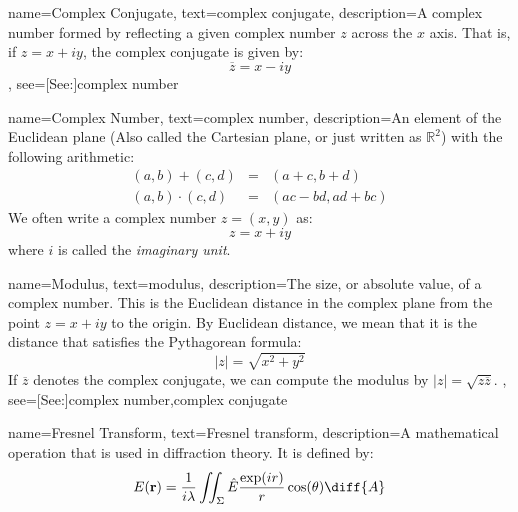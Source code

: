 {
    name={Complex Conjugate},
    text={complex conjugate},
    description={A complex number formed by reflecting a
                 given complex number $z$ across the $x$
                 axis. That is, if $z=x+iy$, the complex
                 conjugate is given by:
                 \begin{equation*}
                     \overline{z}=x-iy
                 \end{equation*}
                },
    see=[See:]{complex number}
}

{
    name={Complex Number},
    text={complex number},
    description={An element of the Euclidean plane (Also called the
                 Cartesian plane, or just written as $\mathbb{R}^{2}$)
                 with the following arithmetic:
                 \begin{eqnarray*}
                     (a,b)+(c,d)
                     \!&\!=\!&\!(a+c,b+d)\\
                     (a,b)\cdot(c,d)
                     \!&\!=\!&\!(ac-bd,ad+bc)
                 \end{eqnarray*}
                 We often write a complex number $z=(x,y)$ as:
                 \begin{equation*}
                     z=x+iy
                 \end{equation*}
                 where $i$ is called the \textit{imaginary unit}.
                }
}

{
    name={Modulus},
    text={modulus},
    description={The size, or absolute value, of a complex number. This
                 is the Euclidean distance in the complex plane from the
                 point $z=x+iy$ to the origin. By Euclidean distance,
                 we mean that it is the distance that satisfies the
                 Pythagorean formula:
                 \begin{equation*}
                     |z|=\sqrt{x^{2}+y^{2}}
                 \end{equation*}
                 If $\overline{z}$ denotes the complex conjugate,
                 we can compute the modulus by
                 $|z|=\sqrt{z\overline{z}}$.
                },
    see=[See:]{complex number,complex conjugate}
}

{
    name={Fresnel Transform},
    text={Fresnel transform},
    description={A mathematical operation that is used in
                 diffraction theory. It is defined by:
                 \begin{equation*}
                     E(\mathbf{r})=\frac{1}{i\lambda}
                     \iint_{\Sigma}\hat{E}\frac{\exp(ir)}{r}
                     \cos(\theta)\diff{A}
                 \end{equation*}
                }
}
